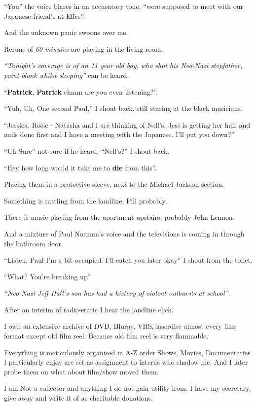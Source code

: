 \documentclass[19pt,openany]{book}
\begin{document}
``You'' the voice blares in an
accusatory tone, ``were supposed to meet with our
Japanese friend's at Effes''.

And the unknown panic swoons over me.

Reruns of \textit{60 minutes}
are playing in the living room.

\textit{``Tonight's coverage is of an
11 year old boy, who shot his Neo-Nazi
stepfather, point-blank whilst
sleeping''} can be heard.


``\textbf{Patrick}, \textbf{Patrick} ehmm are you even
listening?''.

``Yuh, Uh, One second Paul,'' I shout back,
still staring at the black musicians.

``Jessica, Rosie - Natasha and
I are thinking of Nell's.
Jess is getting her hair and nails
done first and I have
a meeting with the Japanese. I'll put you
down?''

``Uh Sure'' not sure if he heard,
``Nell's?'' I shout back.

``Hey how long would it take me to
\textbf{die} from
this''.

Placing them in a protective sleeve,
next to the Michael Jackson section.

Something is rattling
from the landline. Pill probably.

There is music playing
from the apartment upstairs,
probably John Lennon.

And a mixture of Paul Norman's
voice and the televisions
is coming in through the bathroom door.

``Listen, Paul I'm a bit occupied.
I'll catch you later okay'' I shout
from the toilet.

``What? You're breaking up''

\textit{``Neo-Nazi Jeff Hall's son has
had a history of violent outbursts at school''}.

After an interim of radio-static I
hear the landline click.

I own an extensive archive of DVD,
Bluray, VHS, laserdisc almost every
film format except old film reel.
Because old film reel is very
flammable.

Everything is meticulously
organised in A-Z order
Shows, Movies,
Documentaries I particularly
enjoy are set as assignment
to interns who shadow me. And I
later probe them on what about
film/show moved them.

I am Not a collector and
anything I do not gain utility from.
I have my secretary, give
away and write it
of as charitable donations.
\end{document}
